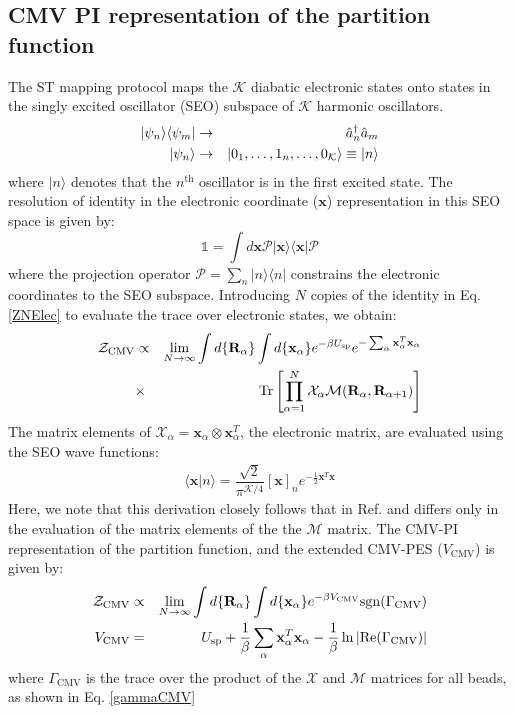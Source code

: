 \documentclass[%
 aip,
 jmp,%
 amsmath,amssymb,
reprint,%
]{revtex4-1}
\begin{document}
\subsection{\label{ssec:level2B} CMV PI representation of the partition function}
The ST mapping protocol maps the $\mathcal{K}$ diabatic electronic states onto states in the singly excited oscillator (SEO) subspace of $\mathcal{K}$ harmonic oscillators. 
\begin{eqnarray}
| \psi_{n} \rangle \langle \psi_{m} |  & \rightarrow & \hat{a}_{n}^{\dagger}\hat{a}_{m} \notag\\
| \psi_{n} \rangle & \rightarrow & | 0_{1},\dots,1_{n},\dots,0_{\mathcal{K}}\rangle \equiv | n\rangle 
\end{eqnarray}
where $|n\rangle$ denotes that the $n^{\mathrm{th}}$ oscillator is in the first excited state. The resolution of identity in the electronic coordinate ($\mathbf{x}$) representation in this SEO space is given by:
\begin{equation}
\mathds{1} = \int d\mathbf{x} \mathcal{P} |\mathbf{x}\rangle \langle \mathbf{x}| \mathcal{P}
\end{equation}
where the projection operator $\mathcal{P} = \sum_{n} | n \rangle \langle n |$ constrains the electronic coordinates to the SEO subspace. 
Introducing $N$ copies of the identity in Eq. \eqref{ZNElec} to evaluate the trace over electronic states, we obtain:
\begin{eqnarray}
\mathcal{Z}_{\mathrm{CMV}} & \propto & \lim_{N\rightarrow \infty} \int d\{ \mathbf{R}_{\alpha} \}  \int d\{ \mathbf{x}_{\alpha} \} e^{-\beta U_{\mathrm{sp}}} e^{-\sum_{\alpha}\mathbf{x}_{\alpha}^T\mathbf{x}_{\alpha}}\notag \\
& \times & \mathrm{Tr}\left[ \prod_{\alpha=1}^{N} \mathcal{X}_{\alpha} \mathcal{M}(\mathbf{R}_{\alpha},\mathbf{R}_{\alpha+1}) \right] \label{gammaCMV}
\end{eqnarray}
The matrix elements of $\mathcal{X}_{\alpha} = \mathbf{x}_{\alpha} \otimes \mathbf{x}_{\alpha}^{T}$, the electronic matrix, are evaluated using the SEO wave functions:
\begin{eqnarray}
\langle \mathbf{x} | n \rangle  = \dfrac{\sqrt{2}}{\pi^{\mathcal{K}/4}} [\mathbf{x}]_{n} e^{-\frac{1}{2}\mathbf{x}^{T}\mathbf{x}}
\end{eqnarray}
Here, we note that this derivation closely follows that in Ref. \cite[23]{} and differs only in the evaluation of the matrix elements of the the $\mathcal{M}$ matrix. The CMV-PI representation of the partition function, and the extended CMV-PES ($V_{\mathrm{CMV}}$) is given by:
\begin{eqnarray}
\mathcal{Z}_{\mathrm{CMV}} & \propto & \lim_{N\rightarrow \infty} \int d\{ \mathbf{R}_{\alpha} \}  \int d\{ \mathbf{x}_{\alpha} \} e^{-\beta V_{\mathrm{CMV}}} \mathrm{sgn}(\Gamma_{\mathrm{CMV}})\notag \\
V_{\mathrm{CMV}} & = & U_{\mathrm{sp}} + \dfrac{1}{\beta} \sum_{\alpha}\mathbf{x}_{\alpha}^T\mathbf{x}_{\alpha} - \dfrac{1}{\beta} \ln | \mathrm{Re}(\Gamma_{\mathrm{CMV}}) |
\end{eqnarray}
where $\Gamma_{\mathrm{CMV}}$ is the trace over the product of the $\mathcal{X}$ and $\mathcal{M}$ matrices for all beads, as shown in Eq. \eqref{gammaCMV}
\end{document}
